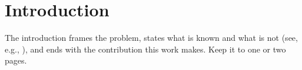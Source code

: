 \section{Introduction}

The introduction frames the problem, states what is known and what is not
(see, e.g., \cite{example2024}), and ends with the contribution this work
makes. Keep it to one or two pages.
